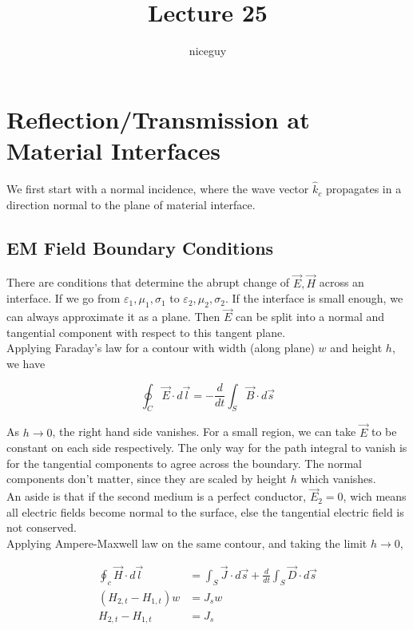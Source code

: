 \documentclass[12pt]{article}
\title{Lecture 25}
\author{niceguy}
\begin{document}
\maketitle

\section{Reflection/Transmission at Material Interfaces}

We first start with a normal incidence, where the wave vector $\hat k_c$ propagates in a direction normal to the plane of material interface.

\subsection{EM Field Boundary Conditions}

There are conditions that determine the abrupt change of $\vec E, \vec H$ across an interface. If we go from $\varepsilon_1, \mu_1, \sigma_1$ to $\varepsilon_2, \mu_2, \sigma_2$. If the interface is small enough, we can always approximate it as a plane. Then $\vec E$ can be split into a normal and tangential component with respect to this tangent plane. \\

Applying Faraday's law for a contour with width (along plane) $w$ and height $h$, we have

$$\oint_C \vec E \cdot d\vec l = -\frac{d}{dt}\int_S \vec B \cdot d\vec s$$

As $h\rightarrow0$, the right hand side vanishes. For a small region, we can take $\vec E$ to be constant on each side respectively. The only way for the path integral to vanish is for the tangential components to agree across the boundary. The normal components don't matter, since they are scaled by height $h$ which vanishes. \\

An aside is that if the second medium is a perfect conductor, $\vec E_2 = 0$, wich means all electric fields become normal to the surface, else the tangential electric field is not conserved. \\

Applying Ampere-Maxwell law on the same contour, and taking the limit $h \rightarrow 0$,

\begin{align*}
    \oint_c \vec H \cdot d\vec l &= \int_S \vec J \cdot d\vec s + \frac{d}{dt} \int_S\vec D \cdot d\vec s \\
    (H_{2,t} - H_{1,t})w &= J_s w \\
    H_{2,t} - H_{1,t} &= J_s
\end{align*}
\end{document}
